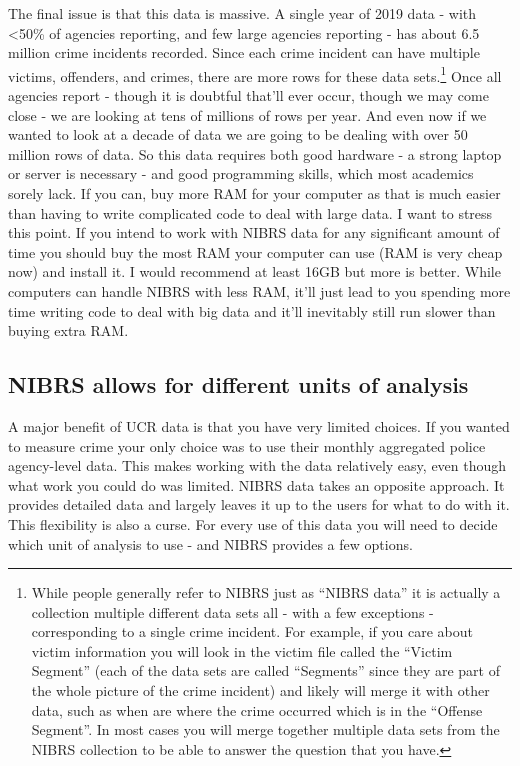 \documentclass[
]{krantz}
\begin{document}
The final issue is that this data is massive. A single year
of 2019 data - with \textless50\% of agencies reporting, and
few large agencies reporting - has about 6.5 million crime
incidents recorded. Since each crime incident can have
multiple victims, offenders, and crimes, there are more rows
for these data sets.\footnote{While people generally refer to
  NIBRS just as ``NIBRS data'' it is actually a collection
  multiple different data sets all - with a few exceptions -
  corresponding to a single crime incident. For example, if
  you care about victim information you will look in the
  victim file called the ``Victim Segment'' (each of the
  data sets are called ``Segments'' since they are part of
  the whole picture of the crime incident) and likely will
  merge it with other data, such as when are where the crime
  occurred which is in the ``Offense Segment''. In most
  cases you will merge together multiple data sets from the
  NIBRS collection to be able to answer the question that
  you have.} Once all agencies report - though it is
doubtful that'll ever occur, though we may come close - we
are looking at tens of millions of rows per year. And even
now if we wanted to look at a decade of data we are going to
be dealing with over 50 million rows of data. So this data
requires both good hardware - a strong laptop or server is
necessary - and good programming skills, which most
academics sorely lack. If you can, buy more RAM for your
computer as that is much easier than having to write
complicated code to deal with large data. I want to stress
this point. If you intend to work with NIBRS data for any
significant amount of time you should buy the most RAM your
computer can use (RAM is very cheap now) and install it. I
would recommend at least 16GB but more is better. While
computers can handle NIBRS with less RAM, it'll just lead to
you spending more time writing code to deal with big data
and it'll inevitably still run slower than buying extra RAM.

\subsection{NIBRS allows for different units of
analysis}\label{nibrs-allows-for-different-units-of-analysis}

A major benefit of UCR data is that you have very limited
choices. If you wanted to measure crime your only choice was
to use their monthly aggregated police agency-level data.
This makes working with the data relatively easy, even
though what work you could do was limited. NIBRS data takes
an opposite approach. It provides detailed data and largely
leaves it up to the users for what to do with it. This
flexibility is also a curse. For every use of this data you
will need to decide which unit of analysis to use - and
NIBRS provides a few options.
\end{document}
